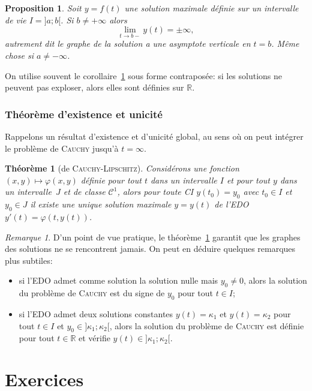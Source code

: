 \documentclass[a4paper,10pt]{scrartcl}
\theoremstyle{definition}
\theoremstyle{remark}
\newtheorem*{remarque}{Remarque}
\theoremstyle{plain}
\newtheorem{thm}[defi]{Théorème}
\newtheorem{proposition}[defi]{Proposition}
\newcommand{\ensemble}[1]{\mathbb{#1}}
\newcommand{\R}{\ensemble{R}}
\begin{document}
\begin{proposition}\label{prop.asymptote}
Soit $y=f(t)$ une solution maximale définie sur un intervalle de vie $I=]a;b[$. Si $b\neq+\infty$ alors
\[
\lim_{t\to b-}y(t)=\pm\infty,
\]
autrement dit le graphe de la solution a une asymptote verticale en $t=b$. Même chose si $a\neq-\infty$.
\end{proposition}
On utilise souvent le corollaire~\ref{prop.asymptote} sous forme contraposée: si les solutions ne peuvent pas \flqq exploser\frqq, alors elles sont définies sur $\R$.


\subsubsection{Théorème d'existence et unicité}
Rappelons un résultat d'existence et d'unicité global, au sens où on peut intégrer le problème de \textsc{Cauchy} jusqu'à $t=\infty$. 
\begin{thm}[de \textsc{Cauchy}-\textsc{Lipschitz}]\label{thm.existence.unicite}
Considérons une fonction $(x,y)\mapsto\varphi(x,y)$ définie pour tout $t$ dans un intervalle $I$ et pour tout $y$ dans un intervalle~$J$ et de classe $\mathcal{C}^1$, alors pour toute CI $y(t_0)=y_0$ avec $t_0\in I$ et $y_0\in J$ il existe une unique solution maximale $y = y(t)$ de l'EDO $y'(t)=\varphi(t,y(t))$.
\end{thm}

\begin{remarque}%
D'un point de vue pratique, le théorème~\ref{thm.existence.unicite} garantit que les graphes des solutions ne se rencontrent jamais. On peut en déduire quelques remarques plus subtiles: 
\begin{itemize}
\item si l'EDO admet comme solution la solution nulle mais $y_0\neq0$, alors la solution du problème de \textsc{Cauchy} est du signe de $y_0$ pour tout $t\in I$;
\item si l'EDO admet deux solutions constantes $y(t)=\kappa_1$ et $y(t)=\kappa_2$ pour tout $t\in I$ et $y_0\in]\kappa_1;\kappa_2[$, alors  la solution du problème de \textsc{Cauchy} est définie pour tout $t\in\R$ et vérifie $y(t)\in]\kappa_1;\kappa_2[$.
\end{itemize}\null
\end{remarque}



\section{Exercices}
\end{document}
